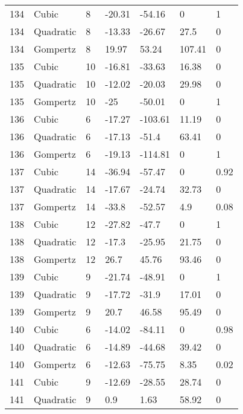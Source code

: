 \documentclass[11pt]{article}
\begin{document}
\begin{center}
\begin{longtable}{lllllll}
    134 & Cubic     & 8               & -20.31  & -54.16  & 0       & 1    \\
    134 & Quadratic & 8               & -13.33  & -26.67  & 27.5    & 0    \\
    134 & Gompertz  & 8               & 19.97   & 53.24   & 107.41  & 0    \\
    135 & Cubic     & 10              & -16.81  & -33.63  & 16.38   & 0    \\
    135 & Quadratic & 10              & -12.02  & -20.03  & 29.98   & 0    \\
    135 & Gompertz  & 10              & -25     & -50.01  & 0       & 1    \\
    136 & Cubic     & 6               & -17.27  & -103.61 & 11.19   & 0    \\
    136 & Quadratic & 6               & -17.13  & -51.4   & 63.41   & 0    \\
    136 & Gompertz  & 6               & -19.13  & -114.81 & 0       & 1    \\
    137 & Cubic     & 14              & -36.94  & -57.47  & 0       & 0.92 \\
    137 & Quadratic & 14              & -17.67  & -24.74  & 32.73   & 0    \\
    137 & Gompertz  & 14              & -33.8   & -52.57  & 4.9     & 0.08 \\
    138 & Cubic     & 12              & -27.82  & -47.7   & 0       & 1    \\
    138 & Quadratic & 12              & -17.3   & -25.95  & 21.75   & 0    \\
    138 & Gompertz  & 12              & 26.7    & 45.76   & 93.46   & 0    \\
    139 & Cubic     & 9               & -21.74  & -48.91  & 0       & 1    \\
    139 & Quadratic & 9               & -17.72  & -31.9   & 17.01   & 0    \\
    139 & Gompertz  & 9               & 20.7    & 46.58   & 95.49   & 0    \\
    140 & Cubic     & 6               & -14.02  & -84.11  & 0       & 0.98 \\
    140 & Quadratic & 6               & -14.89  & -44.68  & 39.42   & 0    \\
    140 & Gompertz  & 6               & -12.63  & -75.75  & 8.35    & 0.02 \\
    141 & Cubic     & 9               & -12.69  & -28.55  & 28.74   & 0    \\
    141 & Quadratic & 9               & 0.9     & 1.63    & 58.92   & 0    \\

\end{longtable}
\end{center}
\end{document}
